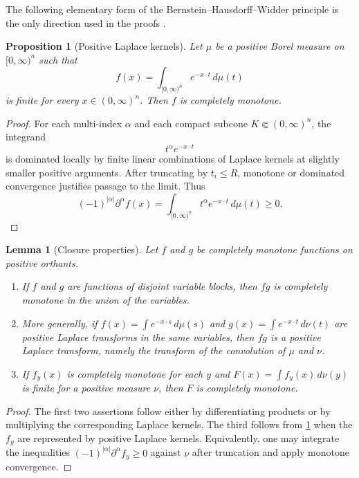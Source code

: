 \documentclass[preprint,12pt,authoryear]{elsarticle}
\numberwithin{equation}{section}
\newtheorem{proposition}[theorem]{Proposition}
\newtheorem{lemma}[theorem]{Lemma}
\theoremstyle{definition}
\theoremstyle{remark}
\newcommand{\1}{\mathbf{1}}
\begin{document}
The following elementary form of the Bernstein--Hausdorff--Widder principle is the only direction used in the proofs \cite[Chapter~IV]{Widder}.

\begin{proposition}[Positive Laplace kernels]
\label{prop:laplace-cm}
Let $\mu$ be a positive Borel measure on $[0,\infty)^n$ such that
\begin{equation}
        f(x)=\int_{[0,\infty)^n} e^{-x\cdot t}\,d\mu(t)
\end{equation}
is finite for every $x\in(0,\infty)^n$.  Then $f$ is completely monotone.
\end{proposition}

\begin{proof}
For each multi-index $\alpha$ and each compact subcone $K\Subset(0,\infty)^n$, the integrand
\begin{equation}
        t^\alpha e^{-x\cdot t}
\end{equation}
is dominated locally by finite linear combinations of Laplace kernels at slightly smaller positive arguments.  After truncating by $t_i\le R$, monotone or dominated convergence justifies passage to the limit.  Thus
\begin{equation}
        (-1)^{|\alpha|}\partial^\alpha f(x)
        =\int_{[0,\infty)^n} t^\alpha e^{-x\cdot t}\,d\mu(t)\ge0.
\end{equation}
\end{proof}

\begin{lemma}[Closure properties]
\label{lem:closure}
Let $f$ and $g$ be completely monotone functions on positive orthants.
\begin{enumerate}
\item If $f$ and $g$ are functions of disjoint variable blocks, then $fg$ is completely monotone in the union of the variables.
\item More generally, if $f(x)=\int e^{-x\cdot s}\,d\mu(s)$ and $g(x)=\int e^{-x\cdot t}\,d\nu(t)$ are positive Laplace transforms in the same variables, then $fg$ is a positive Laplace transform, namely the transform of the convolution of $\mu$ and $\nu$.
\item If $f_y(x)$ is completely monotone for each $y$ and $F(x)=\int f_y(x)\,d\nu(y)$ is finite for a positive measure $\nu$, then $F$ is completely monotone.
\end{enumerate}
\end{lemma}

\begin{proof}
The first two assertions follow either by differentiating products or by multiplying the corresponding Laplace kernels.  The third follows from \cref{prop:laplace-cm} when the $f_y$ are represented by positive Laplace kernels.  Equivalently, one may integrate the inequalities
$(-1)^{|\alpha|}\partial^\alpha f_y\ge0$
against $\nu$ after truncation and apply monotone convergence.
\end{proof}
\end{document}
